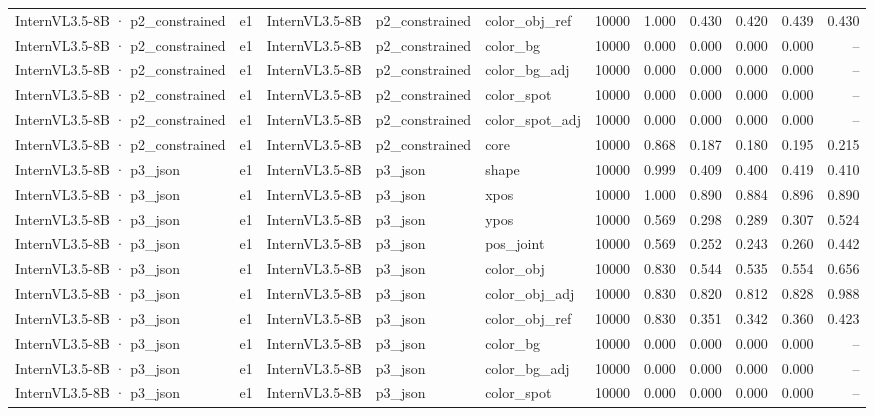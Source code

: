 \begin{tabular}{lllllrrrrrr}
InternVL3.5-8B · p2\_constrained & e1 & InternVL3.5-8B & p2\_constrained & color\_obj\_ref & 10000 & 1.000 & 0.430 & 0.420 & 0.439 & 0.430 \\
InternVL3.5-8B · p2\_constrained & e1 & InternVL3.5-8B & p2\_constrained & color\_bg & 10000 & 0.000 & 0.000 & 0.000 & 0.000 & -- \\
InternVL3.5-8B · p2\_constrained & e1 & InternVL3.5-8B & p2\_constrained & color\_bg\_adj & 10000 & 0.000 & 0.000 & 0.000 & 0.000 & -- \\
InternVL3.5-8B · p2\_constrained & e1 & InternVL3.5-8B & p2\_constrained & color\_spot & 10000 & 0.000 & 0.000 & 0.000 & 0.000 & -- \\
InternVL3.5-8B · p2\_constrained & e1 & InternVL3.5-8B & p2\_constrained & color\_spot\_adj & 10000 & 0.000 & 0.000 & 0.000 & 0.000 & -- \\
InternVL3.5-8B · p2\_constrained & e1 & InternVL3.5-8B & p2\_constrained & core & 10000 & 0.868 & 0.187 & 0.180 & 0.195 & 0.215 \\
InternVL3.5-8B · p3\_json & e1 & InternVL3.5-8B & p3\_json & shape & 10000 & 0.999 & 0.409 & 0.400 & 0.419 & 0.410 \\
InternVL3.5-8B · p3\_json & e1 & InternVL3.5-8B & p3\_json & xpos & 10000 & 1.000 & 0.890 & 0.884 & 0.896 & 0.890 \\
InternVL3.5-8B · p3\_json & e1 & InternVL3.5-8B & p3\_json & ypos & 10000 & 0.569 & 0.298 & 0.289 & 0.307 & 0.524 \\
InternVL3.5-8B · p3\_json & e1 & InternVL3.5-8B & p3\_json & pos\_joint & 10000 & 0.569 & 0.252 & 0.243 & 0.260 & 0.442 \\
InternVL3.5-8B · p3\_json & e1 & InternVL3.5-8B & p3\_json & color\_obj & 10000 & 0.830 & 0.544 & 0.535 & 0.554 & 0.656 \\
InternVL3.5-8B · p3\_json & e1 & InternVL3.5-8B & p3\_json & color\_obj\_adj & 10000 & 0.830 & 0.820 & 0.812 & 0.828 & 0.988 \\
InternVL3.5-8B · p3\_json & e1 & InternVL3.5-8B & p3\_json & color\_obj\_ref & 10000 & 0.830 & 0.351 & 0.342 & 0.360 & 0.423 \\
InternVL3.5-8B · p3\_json & e1 & InternVL3.5-8B & p3\_json & color\_bg & 10000 & 0.000 & 0.000 & 0.000 & 0.000 & -- \\
InternVL3.5-8B · p3\_json & e1 & InternVL3.5-8B & p3\_json & color\_bg\_adj & 10000 & 0.000 & 0.000 & 0.000 & 0.000 & -- \\
InternVL3.5-8B · p3\_json & e1 & InternVL3.5-8B & p3\_json & color\_spot & 10000 & 0.000 & 0.000 & 0.000 & 0.000 & -- \\

\end{tabular}
